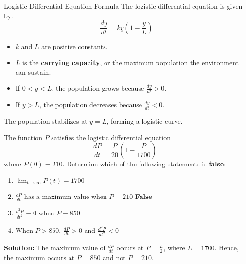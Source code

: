 \documentclass[12pt]{article}
\theoremstyle{beautifulthm}
\begin{document}
\begin{Note}{Logistic Differential Equation Formula}{}
    The logistic differential equation is given by:
\[
\frac{dy}{dt} = ky \left(1 - \frac{y}{L}\right)
\]

\begin{itemize}
    \item $k$ and $L$ are positive constants.
    \item $L$ is the \textbf{carrying capacity}, or the maximum population the environment can sustain.
    \item If $0 < y < L$, the population grows because $\frac{dy}{dt} > 0$.
    \item If $y > L$, the population decreases because $\frac{dy}{dt} < 0$.
\end{itemize}

The population stabilizes at $y = L$, forming a logistic curve.
\end{Note}




\begin{tcolorbox}[colback=examplebg, colframe=red!75!black, title=\textbf{EXAMPLE 1: Logistics Differential Equation}, fonttitle=\bfseries, sharp corners]
The function $P$ satisfies the logistic differential equation
\[
\frac{dP}{dt} = \frac{P}{20} \left(1 - \frac{P}{1700}\right),
\]
where $P(0) = 210$. Determine which of the following statements is \textbf{false}:

\begin{enumerate}
    \item $\lim_{t \to \infty} P(t) = 1700$ \hfill \checkmark
    \item $\frac{dP}{dt}$ has a maximum value when $P = 210$ \hfill \textbf{False}
    \item $\frac{d^2P}{dt^2} = 0$ when $P = 850$ \hfill \checkmark
    \item When $P > 850$, $\frac{dP}{dt} > 0$ and $\frac{d^2P}{dt^2} < 0$ \hfill \checkmark
\end{enumerate}


\tcblower
\textbf{Solution:} 
The maximum value of $\frac{dP}{dt}$ occurs at $P = \frac{L}{2}$, where $L = 1700$. Hence, the maximum occurs at $P = 850$ and not $P = 210$.
\end{tcolorbox}
\end{document}
